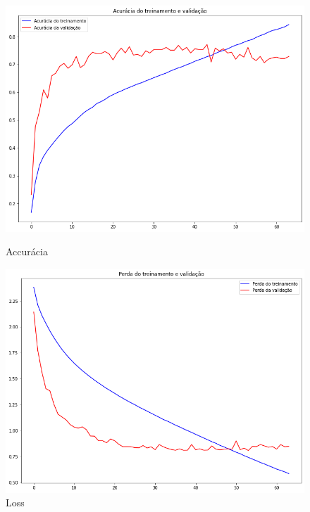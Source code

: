 \documentclass[12pt]{article}
\begin{document}
\begin{figure}[!htb]
  \begin{minipage}{.47\textwidth}
    \centering
    \includegraphics[width=1.1\linewidth]{experiments/lenet5_aug_64/accuracy.png}
    \caption{Accurácia}\label{fig:experiment_lenet5_aug_64_accuracy}
  \end{minipage}\hfill
  \begin{minipage}{.47\textwidth}
    \centering
    \includegraphics[width=1.1\linewidth]{experiments/lenet5_aug_64/loss.png}
    \caption{Loss}\label{fig:experiment_lenet5_aug_64_loss}
  \end{minipage}
\end{figure}
\end{document}
